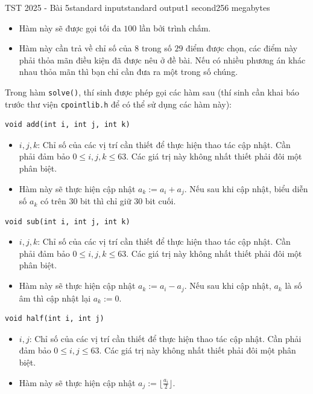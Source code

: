 \begin{problem}{TST 2025 - Bài 5}{standard input}{standard output}{1 second}{256 megabytes}
\begin{itemize}
   \item Hàm này sẽ được gọi tối đa $100$ lần bởi trình chấm.
   \item Hàm này cần trả về chỉ số của $8$ trong số $29$ điểm được chọn, các điểm này phải thỏa mãn điều kiện đã được nêu ở đề bài. Nếu có nhiều phương án khác nhau thỏa mãn thì bạn chỉ cần đưa ra một trong số chúng.
\end{itemize}

Trong hàm \texttt{solve()}, thí sinh được phép gọi các hàm sau (thí sinh cần khai báo trước thư viện \texttt{cpointlib.h} để có thể sử dụng các hàm này):

\begin{lstlisting}
void add(int i, int j, int k)
\end{lstlisting}

\begin{itemize}
   \item $i,j,k$: Chỉ số của các vị trí cần thiết để thực hiện thao tác cập nhật. Cần phải đảm bảo $0\le i,j,k\le 63$. Các giá trị này không nhất thiết phải đôi một phân biệt.
   \item Hàm này sẽ thực hiện cập nhật $a_k:=a_i+a_j$. Nếu sau khi cập nhật, biểu diễn số $a_k$ có trên $30$ bit thì chỉ giữ $30$ bit cuối.
\end{itemize}

\begin{lstlisting}
void sub(int i, int j, int k)
\end{lstlisting}

\begin{itemize}
   \item $i,j,k$: Chỉ số của các vị trí cần thiết để thực hiện thao tác cập nhật. Cần phải đảm bảo $0\le i,j,k\le 63$. Các giá trị này không nhất thiết phải đôi một phân biệt.
   \item Hàm này sẽ thực hiện cập nhật $a_k:=a_i-a_j$. Nếu sau khi cập nhật, $a_k$ là số âm thì cập nhật lại $a_k:=0$.
\end{itemize}

\begin{lstlisting}
void half(int i, int j)
\end{lstlisting}

\begin{itemize}
   \item $i,j$: Chỉ số của các vị trí cần thiết để thực hiện thao tác cập nhật. Cần phải đảm bảo $0\le i,j\le 63$. Các giá trị này không nhất thiết phải đôi một phân biệt.
   \item Hàm này sẽ thực hiện cập nhật $a_j:=\lfloor \frac{a_i}2 \rfloor$.
\end{itemize}


\end{problem}
